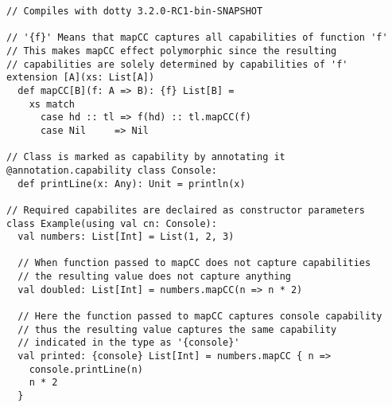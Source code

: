\begin{algorithm}
\begin{verbatim}
// Compiles with dotty 3.2.0-RC1-bin-SNAPSHOT

// '{f}' Means that mapCC captures all capabilities of function 'f'
// This makes mapCC effect polymorphic since the resulting
// capabilities are solely determined by capabilities of 'f'
extension [A](xs: List[A])
  def mapCC[B](f: A => B): {f} List[B] =
    xs match
      case hd :: tl => f(hd) :: tl.mapCC(f)
      case Nil     => Nil

// Class is marked as capability by annotating it
@annotation.capability class Console:
  def printLine(x: Any): Unit = println(x)

// Required capabilites are declaired as constructor parameters
class Example(using val cn: Console):
  val numbers: List[Int] = List(1, 2, 3)
  
  // When function passed to mapCC does not capture capabilities
  // the resulting value does not capture anything
  val doubled: List[Int] = numbers.mapCC(n => n * 2)

  // Here the function passed to mapCC captures console capability
  // thus the resulting value captures the same capability
  // indicated in the type as '{console}'
  val printed: {console} List[Int] = numbers.mapCC { n =>
    console.printLine(n)
    n * 2
  }
\end{verbatim}

\caption{Effect polymorphism with capture checking %
\label{scala:cc-eff-polymorphism}}
\end{algorithm}
